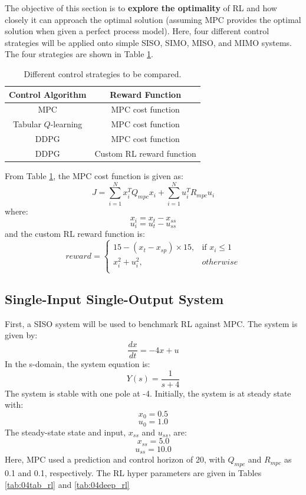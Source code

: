 The objective of this section is to \textbf{explore the optimality} of RL and how closely it can approach the optimal solution (assuming MPC provides the optimal solution when given a perfect process model).  Here, four different control strategies will be applied onto simple SISO, SIMO, MISO, and MIMO systems. The four strategies are shown in Table \ref{tab:04control_and_cost}.

\begin{table}[H]
\caption{Different control strategies to be compared.}
\centering
\begin{tabular}{c|c}
\textbf{Control Algorithm} & \textbf{Reward Function}\\
\hline
MPC		                & MPC cost function		 \\
Tabular $Q$-learning    & MPC cost function		 \\
DDPG	                & MPC cost function		 \\
DDPG         	        & Custom RL reward function	
\label{tab:04control_and_cost}
\end{tabular}
\end{table}

From Table \ref{tab:04control_and_cost}, the MPC cost function is given as:
\begin{equation}
    J = \sum\limits^{N}_{i = 1} x_i^TQ_{mpc}x_i + \sum\limits^N_{i=1}u_i^TR_{mpc}u_i
    \label{eq:04mpc_cost}
\end{equation}
where:
$$x_i = x_t - x_{ss}$$ 
$$u_i = u_t - u_{ss}$$ 
and the custom RL reward function is:
\[
    reward = 
\begin{cases}
    15 - (x_t - x_{sp}) \times 15,              & \text{if } x_i \leq 1 \\
    x_i^2 + u_i^2,              & otherwise \\
    \label{eq:04rl_cost}
\end{cases}
\]

\subsection{Single-Input Single-Output System}
First, a SISO system will be used to benchmark RL against MPC.  The system is given by:
\begin{equation}
\dfrac{dx}{dt} = -4x + u
\end{equation}
\noindent
In the s-domain, the system equation is:
\begin{equation}
Y(s) = \dfrac{1}{s + 4}
\end{equation}
The system is stable with one pole at -4.  Initially, the system is at steady state with:
$$x_0 = 0.5$$
$$u_0 = 1.0$$
The steady-state state and input, $x_{ss}$ and $u_{ss}$, are:
$$x_{ss} = 5.0$$ 
$$u_{ss} = 10.0$$
Here, MPC used a prediction and control horizon of 20, with $Q_{mpc}$ and $R_{mpc}$ as 0.1 and 0.1, respectively.  The RL hyper parameters are given in Tables \ref{tab:04tab_rl} and \ref{tab:04deep_rl}

